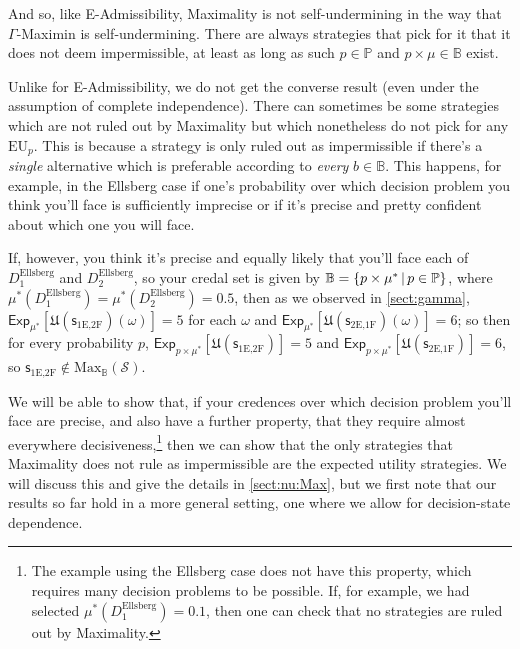 \documentclass[a4paper]{article}
\renewcommand\P{\mathbb{P}} %
\newcommand\Exp{\mathsf{Exp}}
\newcommand\EU{\mathrm{EU}}
\newcommand\U{\mathfrak{U}} %
\newcommand\Maximality{\mathrm{Max}}
\renewcommand\S{\mathcal{S}}
\newcommand\s{\mathsf{s}}
\newcommand{\IB}{\mathbb{B}}
\newcommand{\IP}{\P}
\renewcommand{\color}[1]{}
\newenvironment{colored}[1]{\leavevmode\color{#1}}{}
\newcommand{\Strategies}{\S}
\newcommand\SetDelimiter[1][]{
	\nonscript\,#1\vert \allowbreak \nonscript\,\mathopen{}}
\providecommand\given{\SetDelimiter}
\newenvironment{CCM rewritten}
{\begingroup\color{blue}} %
{\endgroup}              %
\begin{document}
And so, like E-Admissibility, Maximality is not self-undermining in the way that $\Gamma$-Maximin is self-undermining. There are always strategies that pick for it that it does not deem impermissible, %
	at least as long as such $p\in\IP$ and $p\times\mu\in\IB$ exist.

Unlike for E-Admissibility, we do not get the converse result (even under the assumption of complete independence). There can sometimes be some strategies which are not ruled out by Maximality but which nonetheless do not pick for any $\EU_p$. This is because a strategy is only ruled out as impermissible if there's a \emph{single} alternative which is preferable according to \emph{every} $b\in \IB$. 
This happens, for example, in the Ellsberg case if one's probability over which decision problem you think you'll face is sufficiently imprecise or if it's precise and pretty confident about which one you will face. 

If, however, you think it's precise and equally likely that you'll face each of $D^{\mathrm{Ellsberg}}_1$ and $D^{\mathrm{Ellsberg}}_2$, so your credal set is given by $\IB=\{p\times\mu^*\given p\in\IP\}$, where $\mu^*(D^{\mathrm{Ellsberg}}_1)=\mu^*(D^{\mathrm{Ellsberg}}_2)=0.5$, then as we observed in \cref{sect:gamma}, $\Exp_{\mu^*}[\U(\s_{\text{1E,2F}})(\omega)]=5$ for each $\omega$ and $\Exp_{\mu^*}[\U(\s_{\text{2E,1F}})(\omega)]=6$; so then for every probability $p$, $\Exp_{p\times\mu^*}[\U(\s_{\text{1E,2F}})]=5$ and $\Exp_{p\times\mu^*}[\U(\s_{\text{2E,1F}})]=6$, so  $\s_{\text{1E,2F}}\notin\Maximality_\IB(\Strategies)$. 

We will be able to show that, if your credences over which decision problem you'll face are precise, and also have a further property, that they require almost everywhere decisiveness,\footnote{The example using the Ellsberg case does not have this property, which requires many decision problems to be possible. If, for example, we had selected $\mu^*(D^{\mathrm{Ellsberg}}_1)=0.1$, then one can check that no strategies are ruled out by Maximality.} then we can show that the only strategies that Maximality does not rule as impermissible are the expected utility strategies. We will discuss this and give the details in \cref{sect:nu:Max}, but we first note that our results so far hold in a more general setting, one where we allow for decision-state dependence. 
\end{document}
